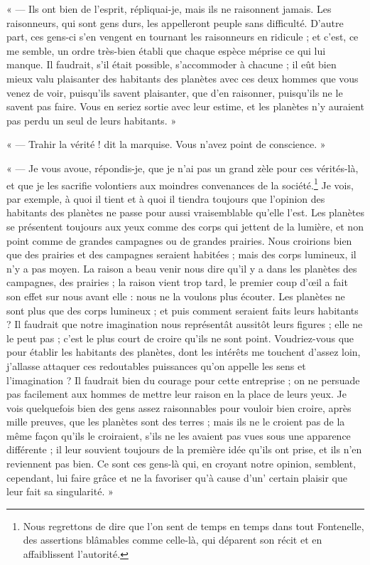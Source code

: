\documentclass[a4paper, 11pt, oneside, landscape]{article}
\begin{document}
« --- Ils ont bien de l'esprit, répliquai-je, mais ils ne raisonnent jamais. Les raisonneurs, qui sont gens durs, les appelleront peuple sans difficulté. D'autre part, ces gens-ci s'en vengent en tournant les raisonneurs en ridicule ; et c'est, ce me semble, un ordre très-bien établi que chaque espèce méprise ce qui lui manque. Il faudrait, s'il était possible, s'accommoder à chacune ; il eût bien mieux valu plaisanter des habitants des planètes avec ces deux hommes que vous venez de voir, puisqu'ils savent plaisanter, que d'en raisonner, puisqu'ils ne le savent pas faire. Vous en seriez sortie avec leur estime, et les planètes n'y auraient pas perdu un seul de leurs habitants. »

« --- Trahir la vérité ! dit la marquise. Vous n'avez point de conscience. »

« --- Je vous avoue, répondis-je, que je n'ai pas un grand zèle pour ces vérités-là, et que je les sacrifie volontiers aux moindres convenances de la société.\footnote{Nous regrettons de dire que l'on sent de temps en temps dans tout Fontenelle, des assertions blâmables comme celle-là, qui déparent son récit et en affaiblissent l'autorité.} Je vois, par exemple, à quoi il tient et à quoi il tiendra toujours que l'opinion des habitants des planètes ne passe pour aussi vraisemblable qu'elle l'est. Les planètes se présentent toujours aux yeux comme des corps qui jettent de la lumière, et non point comme de grandes campagnes ou de grandes prairies. Nous croirions bien que des prairies et des campagnes seraient habitées ; mais des corps lumineux, il n'y a pas moyen. La raison a beau venir nous dire qu'il y a dans les planètes des campagnes, des prairies ; la raison vient trop tard, le premier coup d'œil a fait son effet sur nous avant elle : nous ne la voulons plus écouter. Les planètes ne sont plus que des corps lumineux ; et puis comment seraient faits leurs habitants ? Il faudrait que notre imagination nous représentât aussitôt leurs figures ; elle ne le peut pas ; c'est le plus court de croire qu'ils ne sont point. Voudriez-vous que pour établir les habitants des planètes, dont les intérêts me touchent d'assez loin, j'allasse attaquer ces redoutables puissances qu'on appelle les sens et l'imagination ? Il faudrait bien du courage pour cette entreprise ; on ne persuade pas facilement aux hommes de mettre leur raison en la place de leurs yeux. Je vois quelquefois bien des gens assez raisonnables pour vouloir bien croire, après mille preuves, que les planètes sont des terres ; mais ils ne le croient pas de la même façon qu'ils le croiraient, s'ils ne les avaient pas vues sous une apparence différente ; il leur souvient toujours de la première idée qu'ils ont prise, et ils n'en reviennent pas bien. Ce sont ces gens-là qui, en croyant notre opinion, semblent, cependant, lui faire grâce et ne la favoriser qu'à cause d'un' certain plaisir que leur fait sa singularité. »
\end{document}
